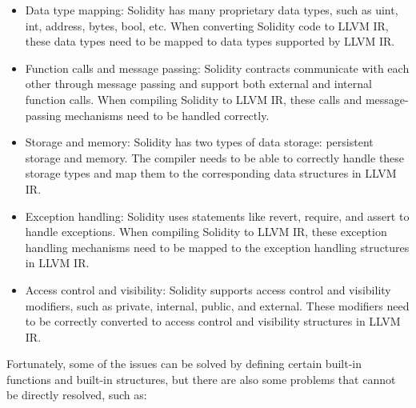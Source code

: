 \begin{itemize}
    \item Data type mapping: Solidity has many proprietary data types, such as uint, int, address, bytes, bool, etc. When converting Solidity code to LLVM IR, these data types need to be mapped to data types supported by LLVM IR.

    \item Function calls and message passing: Solidity contracts communicate with each other through message passing and support both external and internal function calls. When compiling Solidity to LLVM IR, these calls and message-passing mechanisms need to be handled correctly.

    \item Storage and memory: Solidity has two types of data storage: persistent storage and memory. The compiler needs to be able to correctly handle these storage types and map them to the corresponding data structures in LLVM IR.

    \item Exception handling: Solidity uses statements like revert, require, and assert to handle exceptions. When compiling Solidity to LLVM IR, these exception handling mechanisms need to be mapped to the exception handling structures in LLVM IR.

    \item Access control and visibility: Solidity supports access control and visibility modifiers, such as private, internal, public, and external. These modifiers need to be correctly converted to access control and visibility structures in LLVM IR.
\end{itemize}

Fortunately, some of the issues can be solved by defining certain built-in functions and built-in structures, but there are also some problems that cannot be directly resolved, such as:

